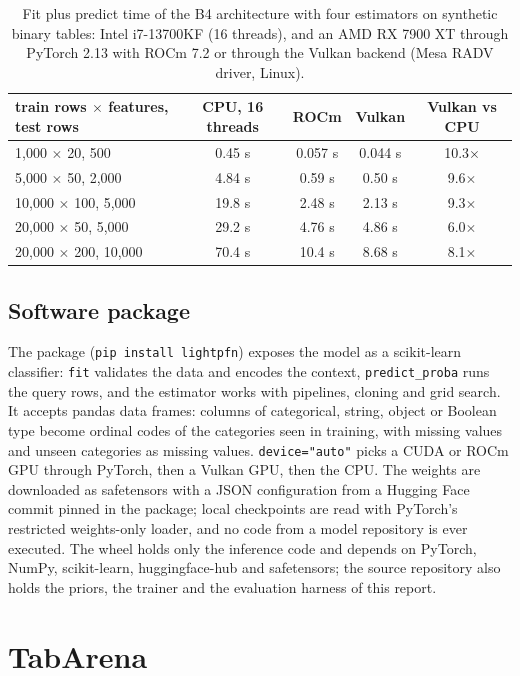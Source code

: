 \documentclass[11pt]{article}
\begin{document}
\begin{table}[t]
\centering
\footnotesize
\begin{tabular}{lcccc}
\toprule
train rows $\times$ features, test rows & CPU, 16 threads & ROCm & Vulkan & Vulkan vs CPU \\
\midrule
1,000 $\times$ 20, 500 & 0.45 s & 0.057 s & 0.044 s & 10.3$\times$ \\
5,000 $\times$ 50, 2,000 & 4.84 s & 0.59 s & 0.50 s & 9.6$\times$ \\
10,000 $\times$ 100, 5,000 & 19.8 s & 2.48 s & 2.13 s & 9.3$\times$ \\
20,000 $\times$ 50, 5,000 & 29.2 s & 4.76 s & 4.86 s & 6.0$\times$ \\
20,000 $\times$ 200, 10,000 & 70.4 s & 10.4 s & 8.68 s & 8.1$\times$ \\
\bottomrule
\end{tabular}
\caption{Fit plus predict time of the B4 architecture with four estimators on synthetic binary tables: Intel
i7-13700KF (16 threads), and an AMD RX 7900 XT through PyTorch 2.13 with ROCm 7.2 or through the Vulkan backend
(Mesa RADV driver, Linux).}
\label{tab:vulkan}
\end{table}

\subsection{Software package}
The package (\texttt{pip install lightpfn}) exposes the model as a scikit-learn classifier: \texttt{fit} validates
the data and encodes the context, \texttt{predict\_proba} runs the query rows, and the estimator works with
pipelines, cloning and grid search. It accepts pandas data frames: columns of categorical, string, object or
Boolean type become ordinal codes of the categories seen in training, with missing values and unseen categories
as missing values. \texttt{device="auto"} picks a CUDA or ROCm GPU through PyTorch, then a Vulkan GPU, then the
CPU. The weights are downloaded as safetensors with a JSON configuration from a Hugging Face commit pinned in the
package; local checkpoints are read with PyTorch's restricted weights-only loader, and no code from a model
repository is ever executed. The wheel holds only the inference code and depends on PyTorch, NumPy, scikit-learn,
huggingface-hub and safetensors; the source repository also holds the priors, the trainer and the evaluation
harness of this report.

\section{TabArena}
\label{sec:tabarena}
\end{document}
